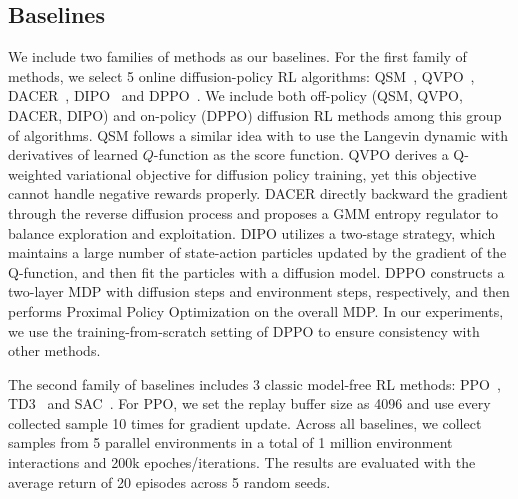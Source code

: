 \subsection{Baselines}
\label{sec:apdx_baselines}
We include two families of methods as our baselines. For the first family of methods, we select 5 online diffusion-policy RL algorithms:  QSM~\cite{psenka2023learning}, QVPO~\cite{ding2024diffusion}, DACER~\cite{wang2024diffusion}, DIPO~\cite{yang2023policy} and DPPO~\cite{ren2024diffusion}. We include both off-policy (QSM, QVPO, DACER, DIPO) and on-policy (DPPO) diffusion RL methods among this group of algorithms. QSM follows a similar idea with  to use the Langevin dynamic with derivatives of learned $Q$-function as the score function. QVPO derives a Q-weighted variational objective for diffusion policy training, yet this objective cannot handle negative rewards properly. DACER directly backward the gradient through the reverse diffusion process and proposes a GMM entropy regulator to balance exploration and exploitation. DIPO utilizes a two-stage strategy, which maintains a large number of state-action particles updated by the gradient of the Q-function, and then fit the particles with a diffusion model.  DPPO constructs a two-layer MDP with diffusion steps and environment steps, respectively, and then performs Proximal Policy Optimization on the overall MDP. In our experiments, we use the training-from-scratch setting of DPPO to ensure consistency with other methods. 

The second family of baselines includes 3 classic model-free RL methods: PPO~\cite{schulman2017proximal}, TD3~\cite{fujimoto2018addressing} and SAC~\cite{haarnoja2018soft}. For PPO, we set the replay buffer size as 4096 and use every collected sample 10 times for gradient update. Across all baselines, we collect samples from 5 parallel environments in a total of 1 million environment interactions and 200k epoches/iterations. The results are evaluated with the average return of 20 episodes across 5 random seeds.
